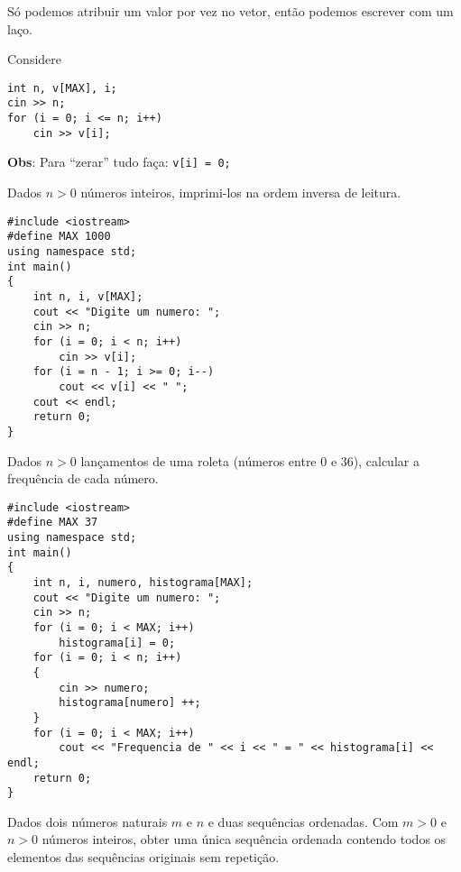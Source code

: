 \documentclass[a4paper]{memoir}
\begin{document}
Só podemos atribuir um valor por vez no vetor, então podemos escrever com um laço.

\begin{ex}
Considere

\begin{lstlisting}
int n, v[MAX], i;
cin >> n;
for (i = 0; i <= n; i++)
    cin >> v[i];
\end{lstlisting}
\end{ex}

\textbf{Obs}: Para ``zerar'' tudo faça: \verb|v[i] = 0;|

\begin{prob}\label{prob301.cpp}
Dados $n > 0$ números inteiros, imprimi-los na ordem inversa de leitura.
\end{prob}

\begin{sol}
\begin{lstlisting}
#include <iostream>
#define MAX 1000
using namespace std;
int main()
{
    int n, i, v[MAX];
    cout << "Digite um numero: ";
    cin >> n;
    for (i = 0; i < n; i++)
        cin >> v[i];
    for (i = n - 1; i >= 0; i--)
        cout << v[i] << " ";
    cout << endl;
    return 0;
}
\end{lstlisting}
\end{sol}

\begin{prob}\label{prob302.cpp}
Dados $n > 0$ lançamentos de uma roleta (números entre $0$ e $36$), calcular a frequência de cada número.
\end{prob}

\begin{sol}
\begin{lstlisting}
#include <iostream>
#define MAX 37
using namespace std;
int main()
{
    int n, i, numero, histograma[MAX];
    cout << "Digite um numero: ";
    cin >> n;
    for (i = 0; i < MAX; i++)
        histograma[i] = 0;
    for (i = 0; i < n; i++)
    {
        cin >> numero;
        histograma[numero] ++;
    }
    for (i = 0; i < MAX; i++)
        cout << "Frequencia de " << i << " = " << histograma[i] << endl;
    return 0;
}
\end{lstlisting}
\end{sol}

\begin{prob}\label{prob303.cpp}
Dados dois números naturais $m$ e $n$ e duas sequências ordenadas. Com $m > 0$ e $n > 0$ números inteiros, obter uma única sequência ordenada contendo todos os elementos das sequências originais sem repetição.
\end{prob}
\end{document}
